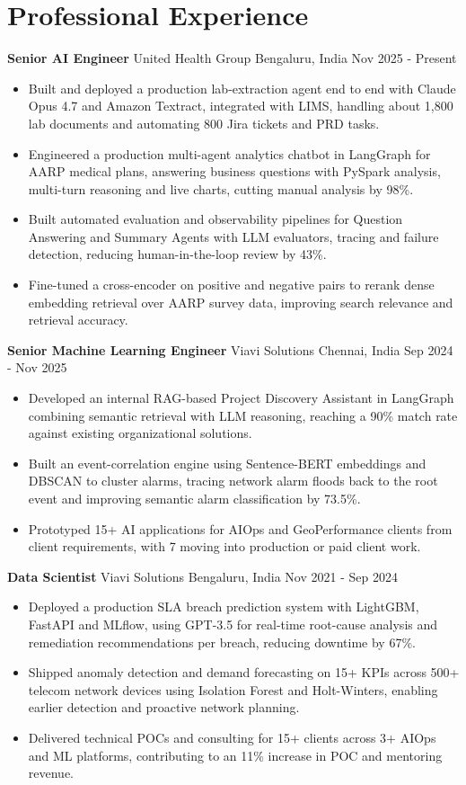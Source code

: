 \documentclass[10pt,a4paper]{article}
\newcommand{\role}[4]{\textbf{#1} \textbar{} #2 \hfill #3 \textbar{} #4\par}
\begin{document}
\section{Professional Experience}
\role{Senior AI Engineer}{United Health Group}{Bengaluru, India}{Nov 2025 - Present}
\begin{itemize}
  \item Built and deployed a production lab-extraction agent end to end with Claude Opus 4.7 and Amazon Textract, integrated with LIMS, handling about 1,800 lab documents and automating 800 Jira tickets and PRD tasks.
  \item Engineered a production multi-agent analytics chatbot in LangGraph for AARP medical plans, answering business questions with PySpark analysis, multi-turn reasoning and live charts, cutting manual analysis by 98\%.
  \item Built automated evaluation and observability pipelines for Question Answering and Summary Agents with LLM evaluators, tracing and failure detection, reducing human-in-the-loop review by 43\%.
  \item Fine-tuned a cross-encoder on positive and negative pairs to rerank dense embedding retrieval over AARP survey data, improving search relevance and retrieval accuracy.
\end{itemize}
\vspace{3pt}
\role{Senior Machine Learning Engineer}{Viavi Solutions}{Chennai, India}{Sep 2024 - Nov 2025}
\begin{itemize}
  \item Developed an internal RAG-based Project Discovery Assistant in LangGraph combining semantic retrieval with LLM reasoning, reaching a 90\% match rate against existing organizational solutions.
  \item Built an event-correlation engine using Sentence-BERT embeddings and DBSCAN to cluster alarms, tracing network alarm floods back to the root event and improving semantic alarm classification by 73.5\%.
  \item Prototyped 15+ AI applications for AIOps and GeoPerformance clients from client requirements, with 7 moving into production or paid client work.
\end{itemize}
\vspace{3pt}
\role{Data Scientist}{Viavi Solutions}{Bengaluru, India}{Nov 2021 - Sep 2024}
\begin{itemize}
  \item Deployed a production SLA breach prediction system with LightGBM, FastAPI and MLflow, using GPT-3.5 for real-time root-cause analysis and remediation recommendations per breach, reducing downtime by 67\%.
  \item Shipped anomaly detection and demand forecasting on 15+ KPIs across 500+ telecom network devices using Isolation Forest and Holt-Winters, enabling earlier detection and proactive network planning.
  \item Delivered technical POCs and consulting for 15+ clients across 3+ AIOps and ML platforms, contributing to an 11\% increase in POC and mentoring revenue.
\end{itemize}
\end{document}
